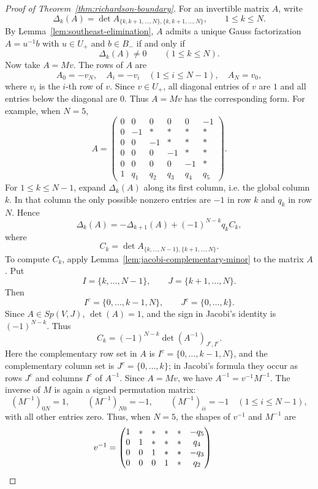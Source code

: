 \documentclass{article}
\begin{document}
\begin{proof}[Proof of Theorem~\ref{thm:richardson-boundary}]
For an invertible matrix \(A\), write
\[
\Delta_k(A)=
\det A_{\{k,k+1,\ldots,N\},\{k,k+1,\ldots,N\}},
\qquad
1\le k\le N.
\]
By Lemma~\ref{lem:southeast-elimination}, \(A\) admits a unique Gauss factorization \(A=u^{-1}b\) with \(u\in U_+\) and \(b\in B_-\) if and only if
\[
\Delta_k(A)\ne0\qquad(1\le k\le N).
\]
Now take \(A=Mv\). The rows of \(A\) are
\[ A_0=-v_N,
\quad
A_i=-v_i\quad(1\le i\le N-1),
\quad
A_N=v_0,
\]
where \(v_i\) is the \(i\)-th row of \(v\). Since \(v\in U_+\), all diagonal entries of \(v\) are \(1\) and all entries below the diagonal are \(0\). Thus \(A=Mv\) has the corresponding form. For example, when \(N=5\),
\[
A=
\begin{pmatrix}
0&0&0&0&0&-1\\
0&-1&*&*&*&*\\
0&0&-1&*&*&*\\
0&0&0&-1&*&*\\
0&0&0&0&-1&*\\
1&q_1&q_2&q_3&q_4&q_5
\end{pmatrix}.
\]
For \(1\le k\le N-1\), expand \(\Delta_k(A)\) along its first column, i.e. the global column \(k\). In that column the only possible nonzero entries are \(-1\) in row \(k\) and \(q_k\) in row \(N\). Hence
\[
\Delta_k(A)
=
-\Delta_{k+1}(A)
+(-1)^{N-k}q_kC_k,
\]
where
\[
C_k=
\det A_{\{k,\ldots,N-1\},\{k+1,\ldots,N\}}.
\]
To compute \(C_k\), apply Lemma~\ref{lem:jacobi-complementary-minor} to the matrix \(A\). Put
\[
I=\{k,\ldots,N-1\},
\qquad
J=\{k+1,\ldots,N\}.
\]
Then
\[
I^c=\{0,\ldots,k-1,N\},
\qquad
J^c=\{0,\ldots,k\}.
\]
Since \(A\in Sp(V,J)\), \(\det(A)=1\), and the sign in Jacobi's identity is \((-1)^{N-k}\). Thus
\[
C_k
=
(-1)^{N-k}
\det(A^{-1})_{J^c,I^c}.
\]
Here the complementary row set in \(A\) is \(I^c=\{0,\ldots,k-1,N\}\), and the complementary column set is \(J^c=\{0,\ldots,k\}\); in Jacobi's formula they occur as rows \(J^c\) and columns \(I^c\) of \(A^{-1}\). Since \(A=Mv\), we have \(A^{-1}=v^{-1}M^{-1}\). The inverse of \(M\) is again a signed permutation matrix:
\[
(M^{-1})_{0N}=1,
\qquad
(M^{-1})_{N0}=-1,
\qquad
(M^{-1})_{ii}=-1\quad(1\le i\le N-1),
\]
with all other entries zero. Thus, when \(N=5\), the shapes of \(v^{-1}\) and \(M^{-1}\) are
\[
\begin{array}{c@{\qquad}c}
v^{-1}=
\begin{pmatrix}
1&*&*&*&*&-q_5\\
0&1&*&*&*&q_4\\
0&0&1&*&*&-q_3\\
0&0&0&1&*&q_2\\

\end{pmatrix}
\end{array}\]
\end{proof}
\end{document}
